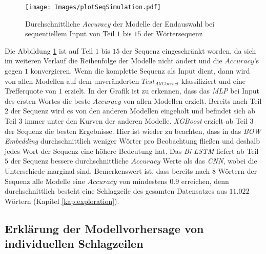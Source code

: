 \documentclass[a4paper,11pt]{article}
\begin{document}
\begin{figure}[ht]
    \centering
\texttt{[image: Images/plotSeqSimulation.pdf]} 
\caption{Durchschnittliche \textit{Accuracy} der Modelle der Endauswahl bei sequentiellem Input von Teil $1$ bis $15$ der Wörtersequenz}
\label{abb:plotSeqSimulation}
\end{figure}


Die Abbildung \ref{abb:plotSeqSimulation} ist auf Teil $1$ bis $15$ der Sequenz eingeschränkt worden, da sich im weiteren Verlauf die Reihenfolge der Modelle nicht ändert und die $Accuracy$'s gegen $1$ konvergieren. Wenn die komplette Sequenz als Input dient, dann wird von allen Modellen auf dem unveränderten $Test_{AllCorrect}$ klassifiziert und eine Trefferquote von $1$ erzielt. In der Grafik ist zu erkennen, dass das \textit{MLP} bei Input des ersten Wortes die beste \textit{Accuracy} von allen Modellen erzielt. Bereits nach Teil $2$ der Sequenz wird es von den anderen Modellen eingeholt und befindet sich ab Teil $3$ immer unter den Kurven der anderen Modelle. \textit{XGBoost} erzielt ab Teil $3$ der Sequenz die besten Ergebnisse. Hier ist wieder zu beachten, dass in das \textit{BOW} \textit{Embedding} durchschnittlich weniger Wörter pro Beobachtung fließen und deshalb jedes Wort der Sequenz eine höhere Bedeutung hat. Das \textit{Bi-LSTM} liefert ab Teil $5$ der Sequenz bessere durchschnittliche $Accuracy$ Werte als das \textit{CNN}, wobei die Unterschiede marginal sind. Bemerkenswert ist, dass bereits nach $8$ Wörtern der Sequenz alle Modelle eine $Accuracy$ von mindestens $0.9$ erreichen, denn durchschnittlich besteht eine Schlagzeile des gesamten Datensatzes aus $11.022$ Wörtern (Kapitel \ref{kap:exploration}).


\subsection{Erklärung der Modellvorhersage von individuellen Schlagzeilen}
\end{document}

